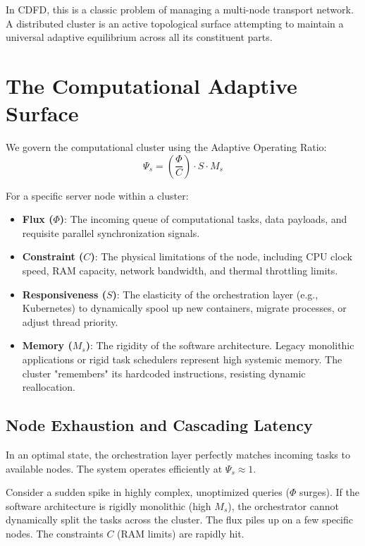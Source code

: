 \documentclass[11pt,a4paper]{article}
\begin{document}
In CDFD, this is a classic problem of managing a multi-node transport network. A distributed cluster is an active topological surface attempting to maintain a universal adaptive equilibrium across all its constituent parts.

\section{The Computational Adaptive Surface}
We govern the computational cluster using the Adaptive Operating Ratio:
\begin{equation}
    \Psi_s = \left( \frac{\Phi}{C} \right) \cdot S \cdot M_s
\end{equation}

For a specific server node within a cluster:
\begin{itemize}
    \item \textbf{Flux ($\Phi$)}: The incoming queue of computational tasks, data payloads, and requisite parallel synchronization signals.
    \item \textbf{Constraint ($C$)}: The physical limitations of the node, including CPU clock speed, RAM capacity, network bandwidth, and thermal throttling limits.
    \item \textbf{Responsiveness ($S$)}: The elasticity of the orchestration layer (e.g., Kubernetes) to dynamically spool up new containers, migrate processes, or adjust thread priority.
    \item \textbf{Memory ($M_s$)}: The rigidity of the software architecture. Legacy monolithic applications or rigid task schedulers represent high systemic memory. The cluster "remembers" its hardcoded instructions, resisting dynamic reallocation.
\end{itemize}

\subsection{Node Exhaustion and Cascading Latency}
In an optimal state, the orchestration layer perfectly matches incoming tasks to available nodes. The system operates efficiently at $\Psi_s \approx 1$.

Consider a sudden spike in highly complex, unoptimized queries ($\Phi$ surges). If the software architecture is rigidly monolithic (high $M_s$), the orchestrator cannot dynamically split the tasks across the cluster. The flux piles up on a few specific nodes. The constraints $C$ (RAM limits) are rapidly hit.
\end{document}
